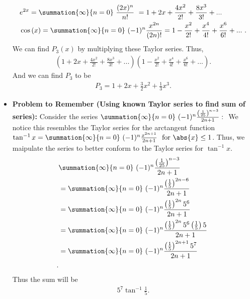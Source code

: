 \documentclass{report}
\begin{document}
\begin{itemize}
\begin{align*}
                    &e^{2x} = \summation{\infty}{n=0}\ \frac{(2x)^{n}}{n!}\  = 1+2x + \frac{4x^{2}}{2!} + \frac{8x^{3}}{3!} + ...\\
                    &\cos{(x)} = \summation{\infty}{n=0}\ (-1)^{n}\frac{x^{2n}}{(2n)!} = 1-\frac{x^{2}}{2!} + \frac{x^{4}}{4!} + \frac{x^{6}}{6!} + ...\ 
                .\end{align*}
                We can find $P_{3}(x)$ by multiplying  these Taylor series. Thus,
                \begin{align*}
                    (1+2x + \frac{4x^{2}}{2!} + \frac{8x^{3}}{3!} + ...)(1-\frac{x^{2}}{2!} + \frac{x^{4}}{4!} + \frac{x^{6}}{6!}+...)
                .\end{align*}
                And we can find $P_{3}$ to be 
                \begin{align*}
                    P_{3} = 1 +2x + \frac{3}{2}x^{2} +\frac{1}{3}x^{3}
                .\end{align*}
            \item \textbf{Problem to Remember (Using known Taylor series to find sum of series):} Consider the series $\summation{\infty}{n=0}\ (-1)^{n}\frac{\left(\frac{1}{25}\right)^{n-3}}{2n+1}:\ $
                \bigbreak \noindent 
                We notice this resembles the Taylor series for the arctangent function $\tan^{-1}{x} = \summation{\infty}{n=0}\ (-1)^{n}\frac{x^{2n+1}}{2n+1}\ \text{ for } \abs{x} \leq 1$. Thus, we maipulate the series to better conform to the Taylor series for $\tan^{-1}{x}$.
                \begin{align*}
                   &\summation{\infty}{n=0}\ (-1)^{n}\frac{\left(\frac{1}{25}\right)^{n-3}}{2n+1}\  \\
                   &=\summation{\infty}{n=0}\ (-1)^{n}\frac{\left(\frac{1}{5}\right)^{2n-6}}{2n+1}\ \\
                   &=\summation{\infty}{n=0}\ (-1)^{n}\frac{\left(\frac{1}{5}\right)^{2n}5^{6}}{2n+1}\ \\
                   &=\summation{\infty}{n=0}\ (-1)^{n}\frac{\left(\frac{1}{5}\right)^{2n}5^{6}\left(\frac{1}{5}\right)5}{2n+1}\ \\
                   &=\summation{\infty}{n=0}\ (-1)^{n}\frac{\left(\frac{1}{5}\right)^{2n+1}5^{7}}{2n+1}\ \\
               .\end{align*}
               Thus the sum will be 
               \begin{align*}
                   5^{7}\tan^{-1}{\frac{1}{5}}
               .\end{align*}

       \end{itemize}
\end{document}
